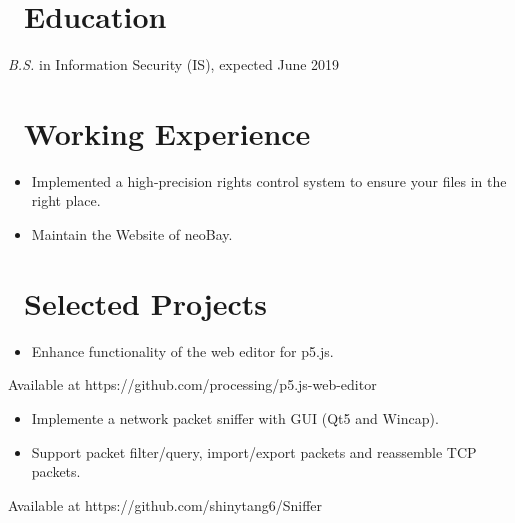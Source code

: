 \documentclass{resume}
\begin{document}



\section{\faGraduationCap\ Education}
\textit{B.S.} in Information Security (IS), expected June 2019

\section{\faBuilding\ Working Experience}

\begin{itemize}
  \item Implemented a high-precision rights control system to ensure your files in the right place.
  \item Maintain the Website of neoBay.
\end{itemize}

\section{\faUsers\ Selected Projects}

\begin{itemize}
  \item Enhance functionality of the web editor for p5.js.
\end{itemize}
Available at https://github.com/processing/p5.js-web-editor


\begin{itemize}
  \item Implemente a network packet sniffer with GUI (Qt5 and Wincap).
  \item Support packet filter/query, import/export packets and reassemble TCP packets.
\end{itemize}
Available at https://github.com/shinytang6/Sniffer
\end{document}
